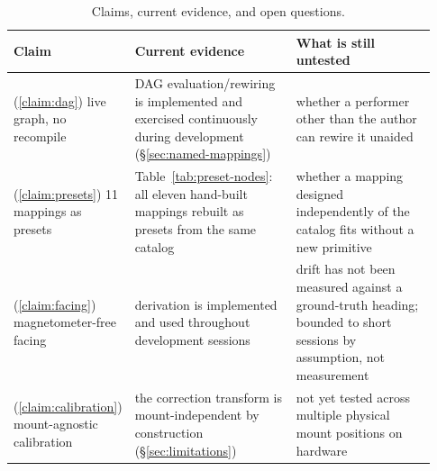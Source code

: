 \documentclass[sigconf,nonacm]{acmart}
\begin{document}
\begin{table}[htbp]
\centering
\small
\caption{Claims, current evidence, and open questions.}
\label{tab:claims-evidence}
\begin{tabular}{@{}p{0.09\linewidth}p{0.44\linewidth}p{0.4\linewidth}@{}}
\toprule
Claim & Current evidence & What is still untested \\
\midrule
(\ref{claim:dag}) live graph, no recompile & DAG evaluation/rewiring is implemented and exercised continuously
during development (\S\ref{sec:named-mappings}) & whether a performer other than the author can
rewire it unaided \\
(\ref{claim:presets}) 11 mappings as presets & Table~\ref{tab:preset-nodes}: all eleven hand-built mappings rebuilt as presets from the
same catalog & whether a mapping designed independently of the catalog fits without a new
primitive \\
(\ref{claim:facing}) magnetometer-free facing & derivation is implemented and used throughout development sessions
& drift has not been measured against a ground-truth heading; bounded to short sessions by
assumption, not measurement \\
(\ref{claim:calibration}) mount-agnostic calibration & the correction transform is mount-independent by construction
(\S\ref{sec:limitations}) & not yet tested across multiple physical mount positions on hardware \\
\bottomrule
\end{tabular}
\end{table}
\end{document}
